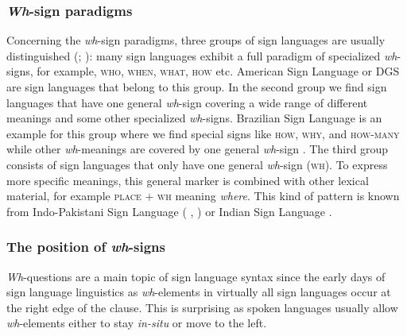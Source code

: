 \largerpage[-1]
\subsubsection{\textit{Wh}-sign paradigms}
Concerning the \textit{wh}-sign paradigms, three groups of sign languages are usually distinguished (\citealt{zeshan2004interrogative}; \citealt[295--296]{signgram2017}): many sign languages exhibit a full paradigm of specialized \textit{wh}-signs, for example, \textsc{who}, \textsc{when}, \textsc{what}, \textsc{how} etc. American Sign Language or DGS are sign languages that belong to this group. In the second group we find sign languages that have one general \textit{wh}-sign covering a wide range of different meanings and some other specialized \textit{wh}-signs. Brazilian Sign Language is an example for this group where we find special signs like \textsc{how}, \textsc{why}, and \textsc{how-many} while other \textit{wh}-meanings are covered by one general \textit{wh}-sign \citep{de2006questions}. The third group consists of sign languages that only have one general \textit{wh}-sign (\textsc{wh}). To express more specific meanings, this general marker is combined with other lexical material, for example \textsc{place} $+$ \textsc{wh} meaning \textit{where}. This kind of pattern is known from Indo-Pakistani Sign Language (\citeauthor{zeshan2004interrogative} \citeyear{zeshan2004interrogative}, \citeyear{zeshan2006negative}) or Indian Sign Language \citep{aboh2006wh}.


\subsubsection{The position of \textit{wh}-signs}
\textit{Wh}-questions are a main topic of sign language syntax since the early days of sign language linguistics as \textit{wh}-elements in virtually all sign languages occur at the right edge of the clause. This is surprising as spoken languages usually allow \textit{wh}-elements either to stay \textit{in-situ} or move to the left.

